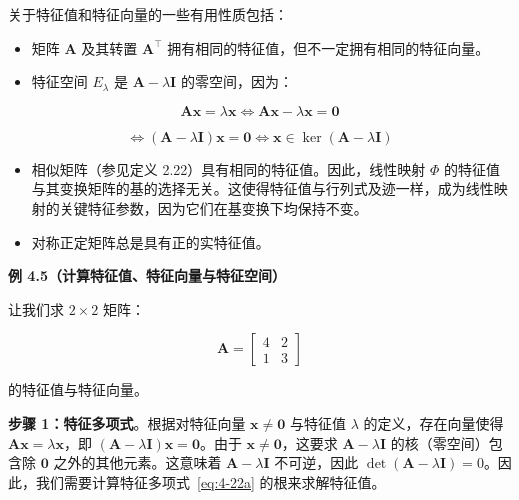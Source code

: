 关于特征值和特征向量的一些有用性质包括：

\begin{itemize}
\item 矩阵 $ \boldsymbol{A} $ 及其转置 $ \boldsymbol{A}^\top $ 拥有相同的特征值，但不一定拥有相同的特征向量。
\item 特征空间 $ E_\lambda $ 是 $ \boldsymbol{A} - \lambda \boldsymbol{I} $ 的零空间，因为：
\end{itemize}

\begin{equation}
\boldsymbol{A} \boldsymbol{x} = \lambda \boldsymbol{x} \iff \boldsymbol{A} \boldsymbol{x} - \lambda \boldsymbol{x} = \boldsymbol{0}
\tag{4.27a}\label{eq:4-27a}
\end{equation}

\begin{equation}
\iff (\boldsymbol{A} - \lambda \boldsymbol{I})\boldsymbol{x} = \boldsymbol{0} \iff \boldsymbol{x} \in \ker(\boldsymbol{A} - \lambda \boldsymbol{I})
\tag{4.27b}\label{eq:4-27b}
\end{equation}

\begin{itemize}
\item 相似矩阵（参见定义 2.22）具有相同的特征值。因此，线性映射 $ \Phi $ 的特征值与其变换矩阵的基的选择无关。这使得特征值与行列式及迹一样，成为线性映射的关键特征参数，因为它们在基变换下均保持不变。
\item 对称正定矩阵总是具有正的实特征值。
\end{itemize}

\begin{notebox}
\textbf{例 4.5（计算特征值、特征向量与特征空间）}
\end{notebox}

\begin{notebox}
让我们求 $ 2 \times 2 $ 矩阵：

\begin{equation}
\boldsymbol{A} = \begin{bmatrix} 4 & 2 \\ 1 & 3 \end{bmatrix}
\tag{4.28}\label{eq:4-28}
\end{equation}

的特征值与特征向量。
\end{notebox}

\begin{notebox}
\textbf{步骤 1：特征多项式}。根据对特征向量 $ \boldsymbol{x} \neq \boldsymbol{0} $ 与特征值 $ \lambda $ 的定义，存在向量使得 $ \boldsymbol{A} \boldsymbol{x} = \lambda \boldsymbol{x} $，即 $ (\boldsymbol{A} - \lambda \boldsymbol{I})\boldsymbol{x} = \boldsymbol{0} $。由于 $ \boldsymbol{x} \neq \boldsymbol{0} $，这要求 $ \boldsymbol{A} - \lambda \boldsymbol{I} $ 的核（零空间）包含除 $ \boldsymbol{0} $ 之外的其他元素。这意味着 $ \boldsymbol{A} - \lambda \boldsymbol{I} $ 不可逆，因此 $ \det(\boldsymbol{A} - \lambda \boldsymbol{I}) = 0 $。因此，我们需要计算特征多项式~\eqref{eq:4-22a} 的根来求解特征值。
\end{notebox}

